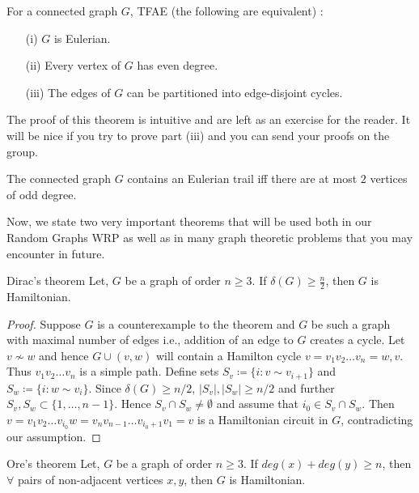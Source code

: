 \documentclass[../basic_graph_theory.tex]{subfiles}
\begin{document}
\begin{Thm}{}{}
\begin{Thm}{}{}
    For a connected graph $G$, TFAE (the following are equivalent) :
    \begin{enumerate}
        \item[(i)] $G$ is Eulerian.
        \item[(ii)] Every vertex of $G$ has even degree.
        \item[(iii)] The edges of $G$ can be partitioned into edge-disjoint cycles.
    \end{enumerate}
\end{Thm}
The proof of this theorem is intuitive and are left as an exercise for the reader. It will be nice if you try to prove part (iii) and you can send your proofs on the group.
\begin{cor}
    The connected graph $G$ contains an Eulerian trail iff there are at most $2$ vertices of odd degree.
\end{cor}

Now, we state two very important theorems that will be used both in our Random Graphs WRP as well as in many graph theoretic problems that you may encounter in future.

\begin{Thm}{Dirac's theorem}{}
    Let, $G$ be a graph of order $n \ge 3$. If $\delta(G) \ge \frac{n}{2}$, then $G$ is Hamiltonian.
\end{Thm}
\begin{proof}
    Suppose $G$ is a counterexample to the theorem and $G$ be such a graph with maximal number of edges i.e., addition of an edge to $G$ creates a cycle.  Let $v \nsim w$ and hence $G \cup (v,w)$ will contain a Hamilton cycle $v = v_1v_2\ldots v_n=w,v$. Thus $v_1v_2\ldots v_n$ is a simple path. Define sets $S_v \coloneqq \{ i : v \sim v_{i+1} \}$ and $S_w \coloneqq \{ i : w \sim v_i\}$. Since $\delta(G) \geq n/2$, $|S_v|, |S_w| \geq n/2$ and further $S_v, S_w \subset \{1,\ldots,n-1\}$. Hence $S_v \cap S_w \neq \emptyset$ and assume that $i_0 \in S_v \cap S_w$. Then $v = v_1v_2\ldots v_{i_0}w=v_nv_{n-1}\ldots v_{i_0+1}v_1=v$ is a Hamiltonian circuit in $G$, contradicting our assumption.
\end{proof}

\begin{Thm}{Ore's theorem}{}
    Let, $G$ be a graph of order $n \ge 3$. If $deg(x)+deg(y) \ge n$, then $\forall$ pairs of non-adjacent vertices $x,y$, then $G$ is Hamiltonian.
\end{Thm}


\end{Thm}
\end{document}
